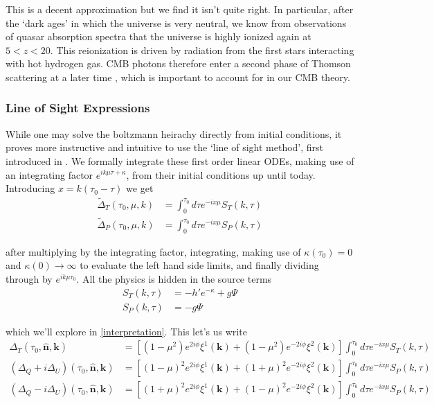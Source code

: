 \documentclass[a4paper,10pt]{article}
\renewcommand{\v}[1]{\mathbf{#1}}
\newcommand{\unit}[1]{\hat{\v{#1}}}
\begin{document}
This is a decent approximation but we find it isn't quite right. In particular, after the `dark ages' in which the universe is very neutral, we know from observations of quasar absorption spectra that the universe is highly ionized again at $5<z<20$. This reionization is driven by radiation from the first stars interacting with hot hydrogen gas. CMB photons therefore enter a second phase of Thomson scattering at a later time \cite{reionisation}, which is important to account for in our CMB theory.

\subsubsection{Line of Sight Expressions}

While one may solve the boltzmann heirachy directly from initial conditions, it proves more instructive and intuitive to use the `line of sight method', first introduced in \citep{LoS}. We formally integrate these first order linear ODEs, making use of an integrating factor $e^{ik\mu\tau+\kappa}$, from their initial conditions up until today.  Introducing $x=k(\tau_0-\tau)$ we get  
\begin{equation}\begin{split}
\tilde{\Delta}_T(\tau_0,\mu,k) &= \int_0^{\tau_0}d\tau e^{-ix\mu}S_T(k,\tau)\\
\tilde{\Delta}_P(\tau_0,\mu,k) &= \int_0^{\tau_0}d\tau e^{-ix\mu}S_P(k,\tau)
\end{split}\end{equation}

after multiplying by the integrating factor, integrating, making use of $\kappa(\tau_0)=0$ and $\kappa(0)\rightarrow \infty$ to evaluate the left hand side limits, and finally dividing through by $e^{ik\mu\tau_0}$. All the physics is hidden in the source terms
\begin{equation}\begin{split}
S_T(k,\tau) &= -h'e^{-\kappa}+g\Psi\\
S_P(k,\tau) &= -g\Psi
\end{split}\end{equation}

which we'll explore in \ref{interpretation}. This let's us write
\begin{equation}\begin{split}
\Delta_T(\tau_0,\unit{n},\v{k}) &= [(1-\mu^2) e^{2i\phi} \xi^1(\v{k})+(1-\mu^2) e^{-2i\phi} \xi^2(\v{k})]\int_0^{\tau_0}d\tau e^{-ix\mu}S_T(k,\tau)\\
(\Delta_Q+i\Delta_U)(\tau_0,\unit{n},\v{k}) &=[(1-\mu)^2 e^{2i\phi} \xi^1(\v{k})+(1+\mu)^2 e^{-2i\phi} \xi^2(\v{k})]\int_0^{\tau_0}d\tau e^{-ix\mu}S_P(k,\tau)\\
(\Delta_Q-i\Delta_U)(\tau_0,\unit{n},\v{k}) &=[(1+\mu)^2 e^{2i\phi} \xi^1(\v{k})+(1-\mu)^2 e^{-2i\phi} \xi^2(\v{k})]\int_0^{\tau_0}d\tau e^{-ix\mu}S_P(k,\tau)
\end{split}\end{equation}
\end{document}
